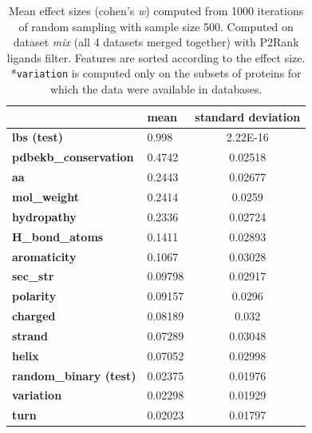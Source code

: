 \begin{table}[]
\centering
\begin{tabular}{@{}llc@{}}
\toprule
                              & \textbf{mean} & \textbf{standard deviation} \\ \midrule
\textbf{lbs (test)}                  & 0.998         & 2.22E-16                    \\
\textbf{pdbekb\_conservation} & 0.4742        & 0.02518                     \\
\textbf{aa}                   & 0.2443        & 0.02677                     \\
\textbf{mol\_weight}          & 0.2414        & 0.0259                      \\
\textbf{hydropathy}           & 0.2336        & 0.02724                     \\
\textbf{H\_bond\_atoms}       & 0.1411        & 0.02893                     \\
\textbf{aromaticity}          & 0.1067        & 0.03028                     \\
\textbf{sec\_str}             & 0.09798       & 0.02917                     \\
\textbf{polarity}             & 0.09157       & 0.0296                      \\
\textbf{charged}              & 0.08189       & 0.032                       \\
\textbf{strand}               & 0.07289       & 0.03048                     \\
\textbf{helix}                & 0.07052       & 0.02998                     \\
\textbf{random\_binary (test)}       & 0.02375       & 0.01976                     \\
\textbf{variation}            & 0.02298       & 0.01929                     \\
\textbf{turn}                 & 0.02023       & 0.01797                     \\ \bottomrule
\end{tabular}
\caption[Mean effect sizes (cohen's \textit{w})]{Mean effect sizes (cohen's \textit{w}) computed from 1000 iterations of random sampling with sample size 500. Computed on dataset \textit{mix} (all 4 datasets merged together) with P2Rank ligands filter. Features are sorted according to the effect size.
\hspace{\textwidth}
*\texttt{variation} is computed only on the subsets of proteins for which the data were available in databases.}
\label{tab:cohensw500}
\end{table}

